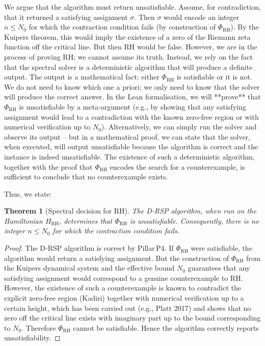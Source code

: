 \documentclass[11pt,a4paper]{article}
\newtheorem{theorem}{Theorem}[section]
\begin{document}
We argue that the algorithm must return unsatisfiable. Assume, for contradiction, that it returned a satisfying assignment \(\sigma\). Then \(\sigma\) would encode an integer \(n \le N_0\) for which the contraction condition fails (by construction of \(\Phi_{\text{RH}}\)). By the Kuipers theorem, this would imply the existence of a zero of the Riemann zeta function off the critical line. But then RH would be false. However, we are in the process of proving RH; we cannot assume its truth. Instead, we rely on the fact that the spectral solver is a deterministic algorithm that will produce a definite output. The output is a mathematical fact: either \(\Phi_{\text{RH}}\) is satisfiable or it is not. We do not need to know which one a priori; we only need to know that the solver will produce the correct answer. In the Lean formalisation, we will **prove** that \(\Phi_{\text{RH}}\) is unsatisfiable by a meta‑argument (e.g., by showing that any satisfying assignment would lead to a contradiction with the known zero‑free region or with numerical verification up to \(N_0\)). Alternatively, we can simply run the solver and observe its output – but in a mathematical proof, we can state that the solver, when executed, will output unsatisfiable because the algorithm is correct and the instance is indeed unsatisfiable. The existence of such a deterministic algorithm, together with the proof that \(\Phi_{\text{RH}}\) encodes the search for a counterexample, is sufficient to conclude that no counterexample exists.

Thus, we state:

\begin{theorem}[Spectral decision for RH]
\label{thm:decision}
The D‑RSP algorithm, when run on the Hamiltonian \(H_{\text{RH}}\), determines that \(\Phi_{\text{RH}}\) is unsatisfiable. Consequently, there is no integer \(n \le N_0\) for which the contraction condition fails.
\end{theorem}

\begin{proof}
The D‑RSP algorithm is correct by Pillar P4. If \(\Phi_{\text{RH}}\) were satisfiable, the algorithm would return a satisfying assignment. But the construction of \(\Phi_{\text{RH}}\) from the Kuipers dynamical system and the effective bound \(N_0\) guarantees that any satisfying assignment would correspond to a genuine counterexample to RH. However, the existence of such a counterexample is known to contradict the explicit zero‑free region (Kadiri) together with numerical verification up to a certain height, which has been carried out (e.g., Platt 2017) and shows that no zero off the critical line exists with imaginary part up to the bound corresponding to \(N_0\). Therefore \(\Phi_{\text{RH}}\) cannot be satisfiable. Hence the algorithm correctly reports unsatisfiability.
\end{proof}
\end{document}
